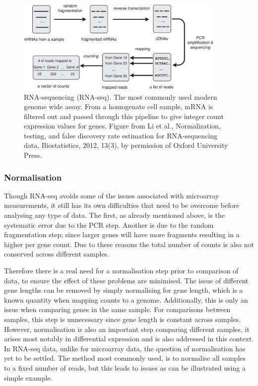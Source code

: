 \begin{figure}
  \centering
  \includegraphics[width=0.9\textwidth]{pics/li-biostats12.jpg}
  \caption{RNA-sequencing (RNA-seq). The most commonly used modern genome wide assay. From a homogenate cell sample, mRNA is filtered out and passed through this pipeline to give integer count expression values for genes. Figure from Li et al., Normalization, testing, and false discovery rate estimation for RNA-sequencing data, Biostatistics, 2012, 13(3), by permission of Oxford University Press.}
  \label{fig:li-biostats}
\end{figure}

\subsubsection{Normalisation}
\label{sec:normalisation}

Though RNA-seq avoids some of the issues associated with microarray measurements, it still has its own difficulties that need to be overcome before analysing any type of data. The first, as already mentioned above, is the systematic error due to the PCR step. Another is due to the random fragmentation step; since larger genes will have more fragments resulting in a higher per gene count. Due to these reasons the total number of counts is also not conserved across different samples.

Therefore there is a real need for a normalisation step prior to comparison of data, to ensure the effect of these problems are minimised. The issue of different gene lengths can be removed by simply normalising for gene length, which is a known quantity when  mapping counts to a genome. Additionally, this is only an issue when comparing genes in the same sample. For comparisons between samples, this step is unnecessary since gene length is constant across samples. However, normalisation is also an important step comparing different samples, it arises most notably in differential expression and is also addressed in this context. In RNA-seq data, unlike for microarray data, the question of normalisation has yet to be settled. The method most commonly used, is to normalise all samples to a fixed number of reads, but this leads to issues as can be illustrated using a simple example.

